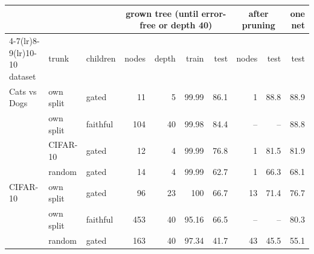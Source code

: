 \begin{tabular}{@{}l l l r r r r r r r@{}}
\toprule
 & & & \multicolumn{4}{c}{grown tree (until error-free or depth 40)} & \multicolumn{2}{c}{after pruning} & one net\\
\cmidrule(lr){4-7}\cmidrule(lr){8-9}\cmidrule(lr){10-10}
dataset & trunk & children & nodes & depth & train & test & nodes & test & test\\
\midrule
Cats vs Dogs & own split & gated & 11 & 5 & 99.99 & 86.1 & 1 & 88.8 & 88.9\\
 & own split & faithful & 104 & 40 & 99.98 & 84.4 & -- & -- & 88.8\\
 & CIFAR-10 & gated & 12 & 4 & 99.99 & 76.8 & 1 & 81.5 & 81.9\\
 & random & gated & 14 & 4 & 99.99 & 62.7 & 1 & 66.3 & 68.1\\
\addlinespace
CIFAR-10 & own split & gated & 96 & 23 & 100 & 66.7 & 13 & 71.4 & 76.7\\
 & own split & faithful & 453 & 40 & 95.16 & 66.5 & -- & -- & 80.3\\
 & random & gated & 163 & 40 & 97.34 & 41.7 & 43 & 45.5 & 55.1\\
\bottomrule
\end{tabular}
